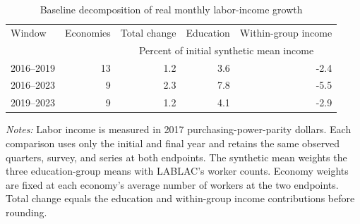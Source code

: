 \begin{table}[htbp]
\centering
\caption{Baseline decomposition of real monthly labor-income growth}
\label{tab:latam_sample_decomposition}
\begin{tabular}{lrrrr}
\toprule
Window & Economies & Total change & Education & Within-group income \\
& & \multicolumn{3}{c}{Percent of initial synthetic mean income} \\
\midrule
2016--2019 & 13 & 1.2 & 3.6 & -2.4 \\
2016--2023 & 9 & 2.3 & 7.8 & -5.5 \\
2019--2023 & 9 & 1.2 & 4.1 & -2.9 \\
\bottomrule
\end{tabular}
\begin{minipage}{0.96\textwidth}
\textit{Notes:} Labor income is measured in 2017 purchasing-power-parity
dollars. Each comparison uses only the initial and final year and retains the
same observed quarters, survey, and series at both endpoints. The synthetic
mean weights the three education-group means with LABLAC's worker counts.
Economy weights are fixed at each economy's average number of workers at the
two endpoints. Total change equals the education and within-group income
contributions before rounding.
\end{minipage}
\end{table}

